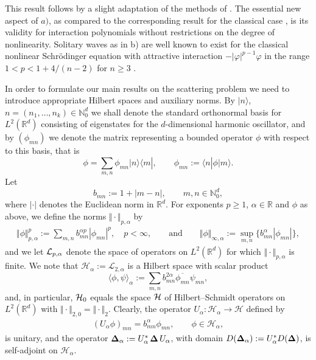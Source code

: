 \documentclass[pdftex]{sigma}
\begin{document}
This result follows by a slight adaptation of the methods of \cite{DJN,DJ}.
 The essential new aspect of $a)$, as compared to the corresponding
result for the  classical case \cite[Theorem 3.2]{Strauss}, is its validity for
interaction polynomials without
restrictions on the degree of nonlinearity. Solitary waves as in b)
 are well known to exist for the classical nonlinear
Schr{\"o}dinger equation with attractive interaction
$-|\varphi|^{p-1}\varphi$ in the range $1<p<1+4/(n-2)$ for  $n\geq 3$ \cite{CaLi,GSS,ShStrauss}.



 In order to formulate our main results on the scattering problem we
need to introduce ap\-propriate Hilbert spaces and auxiliary norms.
By $\vert n\rangle$, $n=(n_1,\dots,n_k)\in\mathbb N_0^d$ we shall denote the
standard orthonormal basis for $L^2(\mathbb R^d)$ consisting of
eigenstates for the $d$-dimensional harmonic oscillator, and by
$(\phi_{mn})$ we denote the matrix representing a bounded operator
$\phi$ with respect to this basis, that is
\[
\phi = \sum_{m,n}\phi_{mn}\vert n\rangle\langle m|,\qquad \phi_{mn}:=\langle n|\phi|m\rangle .
\]
Let
\[
b_{mn} := 1+|m-n| ,\qquad m,n\in \mathbb N_0^d ,
\]
where $|\cdot|$ denotes the Euclidean norm in $\mathbb R^d$. For
exponents $p\geq 1$, $\alpha\in\mathbb R$ and $\phi$ as above, we def\/ine
the norms $\Vert\cdot \Vert_{p,\alpha}$  by
\begin{gather}
\label{alphanorms}
\Vert\phi\Vert_{p,\alpha}^p := \sum_{m,n}b_{mn}^{\alpha p}|\phi_{mn}|^p ,
\quad p<\infty, \qquad\mbox{and}\qquad
\Vert\phi\Vert_{\infty,\alpha}:=\sup_{m,n}\{b_{mn}^\alpha|\phi_{mn}|\} ,
\end{gather}
and we let ${\cal L}_{p,\alpha}$ denote the space of operators
on $L^2(\mathbb R^d)$ for which
$\Vert\cdot \Vert_{p,\alpha}$ is f\/inite. We note that
$\mathcal H_{\alpha}:=\mathcal L_{2,\alpha}$ is a  Hilbert space with
scalar product
\[
\langle\phi,\psi\rangle_\alpha:=\sum_{m,n}b_{mn}^{2\alpha} \overline{\phi_{mn}}
 \psi_{mn} ,
\]
and, in particular, ${\cal H}_{0}$ equals  the space $\cal H$ of
Hilbert--Schmidt operators on $L^2(\mathbb R^d)$ with $\Vert\cdot\Vert_{2,0} =
\Vert\cdot\Vert_2$.
Clearly, the operator $U_\alpha:\mathcal H_\alpha\to \mathcal H$ def\/ined by
\begin{gather}\label{Ualpha}
(U_\alpha\phi)_{mn}=
b^{\alpha}_{mn}\phi_{mn} ,\qquad \phi\in\mathcal H_\alpha ,
\end{gather}
is unitary, and the operator
${\bf\Delta}_\alpha := U_\alpha^*\, {\bf \Delta}\,U_\alpha$, with domain
$D({\bf\Delta}_\alpha):=U_\alpha^* D({\bf \Delta})$,
 is self-adjoint on $\mathcal H_\alpha$.
\end{document}
